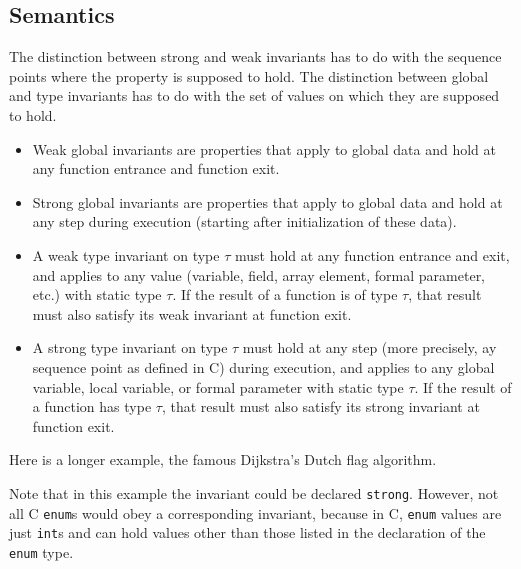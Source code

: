 \subsection{Semantics}

The distinction between strong and weak invariants has to do with the
sequence points where the property is supposed to hold. The distinction
between global and type invariants has to do with the set of values on
which they are supposed to hold.

\begin{itemize}
\item Weak global invariants are properties that apply to global
  data and hold at any function entrance and function exit.

\item Strong global invariants are properties that apply to global
  data and hold at any step during execution (starting after
  initialization of these data).

\item A weak type invariant on type $\tau$ must hold at any function
  entrance and exit, and applies to any value (variable, field, array element, formal
  parameter, etc.) with static type $\tau$. If the result of a
  function is of type $\tau$, that result must also satisfy its
  weak invariant at function exit. 

\item A strong type invariant on type $\tau$ must hold at any step 
(more precisely, ay sequence point as defined in C)
  during execution, and applies to any global variable, local
  variable, or formal parameter
  with static type $\tau$. If the
  result of a function has type $\tau$, that result must also
  satisfy its strong invariant at function exit.

\end{itemize}


\begin{example}

\end{example}

\begin{example}
  Here is a longer example, the famous Dijkstra's Dutch flag algorithm.\\
\end{example}
Note that in this example the invariant could be declared \lstinline|strong|. However, not all C \lstinline|enum|s would 
obey a corresponding invariant, because in C, \lstinline|enum| values are just \lstinline|int|s and can hold values other
than those listed in the declaration of the \lstinline|enum| type.

